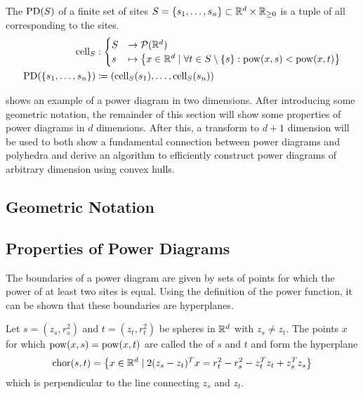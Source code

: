 \begin{definition}
    \label{def:powerdiagram}
    The  $\operatorname{PD}(S)$ of a finite set of sites $S = \left\{ s_1, \dots, s_n \right\} \subset \mathbb{R}^d \times \mathbb{R}_{\geq 0}$ is a tuple of all  corresponding to the sites.
    \begin{align}
        \operatorname{cell}_S &: \begin{cases}
            S &\to \mathcal{P}(\mathbb{R}^d)\\
            s &\mapsto \left\{ x \in \mathbb{R}^d \mid \forall t \in S \setminus \left\{ s \right\}: \operatorname{pow}(x, s) < \operatorname{pow}(x, t) \right\}
        \end{cases}\\
        \operatorname{PD}(\left\{ s_1, \dots, s_n \right\}) &\coloneqq \left( \operatorname{cell}_S(s_1), \dots, \operatorname{cell}_S(s_n) \right)
    \end{align}
\end{definition}

 shows an example of a power diagram in two dimensions.
After introducing some geometric notation, the remainder of this section will show some properties of power diagrams in $d$ dimensions.
After this, a transform to $d + 1$ dimension will be used to both show a fundamental connection between power diagrams and polyhedra and derive an algorithm to efficiently construct power diagrams of arbitrary dimension using convex hulls.

\subsection{Geometric Notation}
\label{sub:geometric_notation}

\subsection{Properties of Power Diagrams}
\label{sub:properties_of_power_diagrams}
The boundaries of a power diagram are given by sets of points for which the power of at least two sites is equal.
Using the definition of the power function, it can be shown that these boundaries are hyperplanes.
\begin{observation}
    \label{obs:chordale}
    Let $s = (z_s, r^2_s)$ and $t = (z_t, r^2_t)$ be spheres in $\mathbb{R}^d$ with $z_s \neq z_t$. The points $x$ for which $\operatorname{pow}(x, s) = \operatorname{pow}(x, t)$ are called the  of $s$ and $t$ and form the hyperplane
    \begin{align}
        \operatorname{chor}(s, t) = \left\{ x \in \mathbb{R}^d \mid 2(z_s - z_t)^Tx = r_t^2 - r_s^2 - z_t^Tz_t + z_s^Tz_s \right\}
    \end{align}
    which is perpendicular to the line connecting $z_s$ and $z_t$.
\end{observation}

